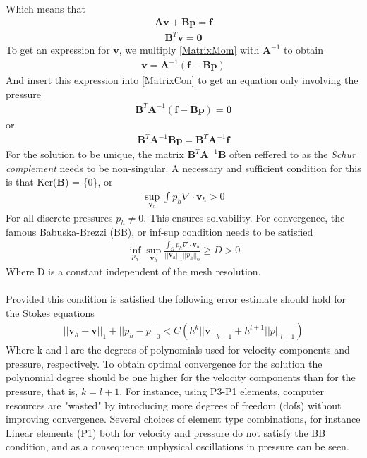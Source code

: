 Which means that
\begin{align}
\mathbf{A}\mathbf{v} + \mathbf{B}\mathbf{p} = \mathbf{f} \label{MatrixMom}
\end{align}
\begin{align}
\mathbf{B}^T \mathbf{v} = \mathbf{0}   \label{MatrixCon}
\end{align}
To get an expression for $\mathbf{v}$, we multiply \eqref{MatrixMom} with $\mathbf{A}^{-1}$ to obtain
\begin{align}
\mathbf{v} = \mathbf{A}^{-1}(\mathbf{f} - \mathbf{B}\mathbf{p})
\end{align}
And insert this expression into \eqref{MatrixCon} to get an equation only involving the pressure
\begin{align}
\mathbf{B}^T \mathbf{A}^{-1}(\mathbf{f} - \mathbf{B}\mathbf{p}) = \mathbf{0}
\end{align}
or
\begin{align}
\mathbf{B}^T\mathbf{A}^{-1}\mathbf{B}\mathbf{p} = \mathbf{B}^T\mathbf{A}^{-1}\mathbf{f}
\end{align}
For the solution to be unique, the matrix $\mathbf{B}^T\mathbf{A}^{-1}\mathbf{B}$ often reffered to as the \textit{Schur complement} needs to be non-singular. A necessary and sufficient condition for this is that Ker($\mathbf{B}$) = \{0\}, or
\begin{align}
\sup_{\mathbf{v}_h}\int p_h \nabla \cdot \mathbf{v}_h > 0
\end{align}
For all discrete pressures $p_h \neq 0$. 
This ensures solvability. For convergence, the famous Babuska-Brezzi (BB), or inf-sup condition needs to be satisfied \cite{Brez12}
\begin{align}
\inf_{p_h}\sup_{\mathbf{v}_h} \frac{\int_{\Omega}p_h \nabla \cdot \mathbf{v}_h}{||\mathbf{v}_h||_1 ||p_h||_0} \geq D > 0
\end{align}
Where D is a constant independent of the mesh resolution. 
\\
\\
Provided this condition is satisfied the following error estimate should hold for the Stokes equations
\begin{align}
||\mathbf{v}_h-\mathbf{v}||_1 + ||p_h - p||_0 < C(h^k||\mathbf{v}||_{k+1} + h^{l+1}||p||_{l+1})
\end{align}
Where k and l are the degrees of polynomials used for velocity components and pressure, respectively. To obtain optimal convergence for the solution the polynomial degree should be one higher for the velocity components than for the pressure, that is, $k = l+1$. For instance, using P3-P1 elements, computer resources are "wasted" by introducing more degrees of freedom (dofs) without improving convergence. Several choices of element type combinations, for instance Linear elements (P1) both for velocity and pressure do not satisfy the BB condition, and as a consequence unphysical oscillations in pressure can be seen. 
